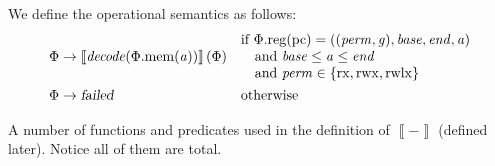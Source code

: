 \documentclass[a4paper]{article}
\newcommand{\sem}[1]{\left\llbracket #1 \right\rrbracket}
\newcommand\lau[1]{{\color{purple} \sf \footnotesize {LS: #1}}\\}
\renewcommand\lau[1]{}
\newcommand{\var}[1]{\mathit{#1}}
\newcommand{\gl}{\var{g}}
\newcommand{\pcreg}{\mathrm{pc}}
\newcommand{\addr}{\var{a}}
\newcommand{\start}{\var{base}}
\newcommand{\addrend}{\var{end}}
\newcommand{\perm}{\var{perm}}
\newcommand{\stdcap}[1][(\perm,\gl)]{\left(#1,\start,\addrend,\addr \right)}
\newcommand{\plainproj}[1]{\mathrm{#1}}
\newcommand{\memheap}[1][\Phi]{#1.\plainproj{mem}}
\newcommand{\memreg}[1][\Phi]{#1.\plainproj{reg}}
\newcommand{\failed}{\textsl{failed}}
\newcommand{\plainfun}[2]{
  \ifthenelse{\equal{#2}{}}
  {\mathit{#1}}
  {\mathit{#1}(#2)}
}
\newcommand{\decode}{\plainfun{decode}{}}
\newcommand{\plainperm}[1]{\mathrm{#1}}
\newcommand{\exec}{\plainperm{rx}}
\newcommand{\rwx}{\plainperm{rwx}}
\newcommand{\rwlx}{\plainperm{rwlx}}
\begin{document}
We define the operational semantics as follows:
\begin{align*}
  \Phi & \rightarrow \sem{\decode(\memheap(\addr))}(\Phi) & &                                   
                                                              \arraycolsep=0pt
                                                              \begin{array}{l}
                                                                \text{if $\memreg(\pcreg) = \stdcap$}\\
                                                                \quad\text{and $\start \leq \addr \leq \addrend$}\\
                                                                \quad\text{and $\perm \in \{ \exec,\rwx, \rwlx \}$ }
                                                              \end{array}\\
  \Phi & \rightarrow \failed                                 & & \text{otherwise}
\end{align*}
\lau{With respect to our talk about whether the upper bound should be included in the range of authority or not, I have found one example where it would work better when the upper-bound is not included. If we have a stack and call and want to pass the empty part on, then if the unused part of the stack is 0 cells, then we cannot pass anything that ``looks like a stack''.}
A number of functions and predicates used in the definition of $\sem{-}$ (defined later). Notice all of them are total.
\end{document}
